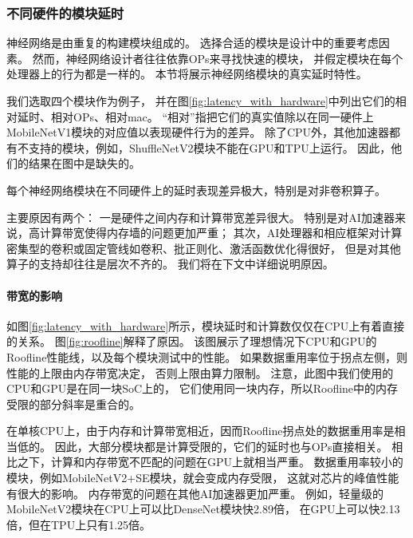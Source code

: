 \subsubsection{不同硬件的模块延时}
\label{analysis:op block:block with hardware}


神经网络是由重复的构建模块组成的。
选择合适的模块是设计中的重要考虑因素。
然而，神经网络设计者往往依靠OPs来寻找快速的模块，
并假定模块在每个处理器上的行为都是一样的。
本节将展示神经网络模块的真实延时特性。

我们选取四个模块作为例子，
并在图\ref{fig:latency_with_hardware}中列出它们的相对延时、相对OPs、相对mac。
``相对''指把它们的真实值除以在同一硬件上MobileNetV1模块的对应值以表现硬件行为的差异。
除了CPU外，其他加速器都有不支持的模块，例如，ShuffleNetV2模块不能在GPU和TPU上运行。
因此，他们的结果在图中是缺失的。

\begin{finding}
    每个神经网络模块在不同硬件上的延时表现差异极大，特别是对非卷积算子。
\end{finding}

主要原因有两个：
一是硬件之间内存和计算带宽差异很大。
特别是对AI加速器来说，高计算带宽使得内存墙的问题更加严重；
其次，AI处理器和相应框架对计算密集型的卷积或固定管线如卷积、批正则化、激活函数优化得很好，
但是对其他算子的支持却往往是层次不齐的。
我们将在下文中详细说明原因。

\paragraph{带宽的影响}
如图\ref{fig:latency_with_hardware}所示，模块延时和计算数仅仅在CPU上有着直接的关系。
图\ref{fig:roofline}解释了原因。
该图展示了理想情况下CPU和GPU的Roofline性能线，以及每个模块测试中的性能。
如果数据重用率位于拐点左侧，则性能的上限由内存带宽决定，
否则上限由算力限制。
注意，此图中我们使用的CPU和GPU是在同一块SoC上的，
它们使用同一块内存，所以Roofline中的内存受限的部分斜率是重合的。

在单核CPU上，由于内存和计算带宽相近，因而Roofline拐点处的数据重用率是相当低的。
因此，大部分模块都是计算受限的，它们的延时也与OPs直接相关。
相比之下，计算和内存带宽不匹配的问题在GPU上就相当严重。
数据重用率较小的模块，例如MobileNetV2+SE模块，就会变成内存受限，
这就对芯片的峰值性能有很大的影响。
内存带宽的问题在其他AI加速器更加严重。
例如，轻量级的MobileNetV2模块在CPU上可以比DenseNet模块快2.89倍，
在GPU上可以快2.13倍，但在TPU上只有1.25倍。

